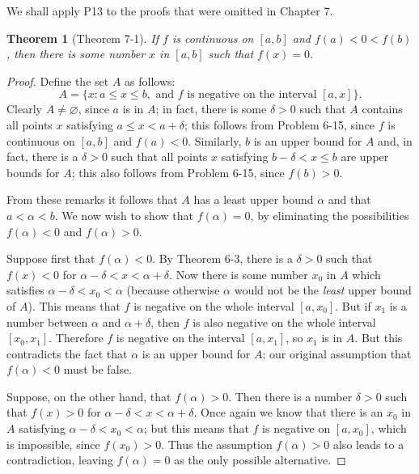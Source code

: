 \documentclass{article}
\newtheorem*{theorem*}{Theorem}
\begin{document}
We shall apply P13 to the proofs that were omitted in Chapter 7.

\begin{theorem*}[Theorem 7-1]
  If $f$ is continuous on $[a, b]$ and $f(a) < 0 < f(b)$, then there is some
  number $x$ in $[a, b]$ such that $f(x) = 0$.
\end{theorem*}

\begin{proof}
  Define the set $A$ as follows: \begin{equation*}
    A = \{x : a \leq x \leq b, \text{ and } f \text{ is negative on the interval
      } [a, x]\}.
  \end{equation*}
  Clearly $A \neq \varnothing$, since $a$ is in $A$; in fact, there is some
  $\delta > 0$ such that $A$ contains all points $x$ satisfying $a \leq x < a +
  \delta$; this follows from Problem 6-15, since $f$ is continuous on $[a, b]$
  and $f(a) < 0$. Similarly, $b$ is an upper bound for $A$ and, in fact, there is
  a $\delta > 0$ such that all points $x$ satisfying $b - \delta < x \leq b$ are
  upper bounds for $A$; this also follows from Problem 6-15, since $f(b) > 0$.

  From these remarks it follows that $A$ has a least upper bound $\alpha$ and
  that $a < \alpha < b$. We now wish to show that $f(\alpha) = 0$, by eliminating
  the possibilities $f(\alpha) < 0$ and $f(\alpha) > 0$.

  Suppose first that $f(\alpha) < 0$. By Theorem 6-3, there is a $\delta > 0$
  such that $f(x) < 0$ for $\alpha - \delta < x < \alpha + \delta$. Now there is
  some number $x_0$ in $A$ which satisfies $\alpha - \delta < x_0 < \alpha$
  (because otherwise $\alpha$ would not be the \emph{least} upper bound of $A$).
  This means that $f$ is negative on the whole interval $[a, x_0]$. But if $x_1$
  is a number between $\alpha$ and $\alpha + \delta$, then $f$ is also negative
  on the whole interval $[x_0, x_1]$. Therefore $f$ is negative on the interval
  $[a, x_1]$, so $x_1$ is in $A$. But this contradicts the fact that $\alpha$ is
  an upper bound for $A$; our original assumption that $f(\alpha) < 0$ must be
  false.

  Suppose, on the other hand, that $f(\alpha) > 0$. Then there is a number
  $\delta > 0$ such that $f(x) > 0$ for $\alpha - \delta < x < \alpha + \delta$.
  Once again we know that there is an $x_0$ in $A$ satisfying $\alpha - \delta <
  x_0 < \alpha$; but this means that $f$ is negative on $[a, x_0]$, which is
  impossible, since $f(x_0) > 0$. Thus the assumption $f(\alpha) > 0$ also leads
  to a contradiction, leaving $f(\alpha) = 0$ as the only possible alternative.
\end{proof}
\end{document}
